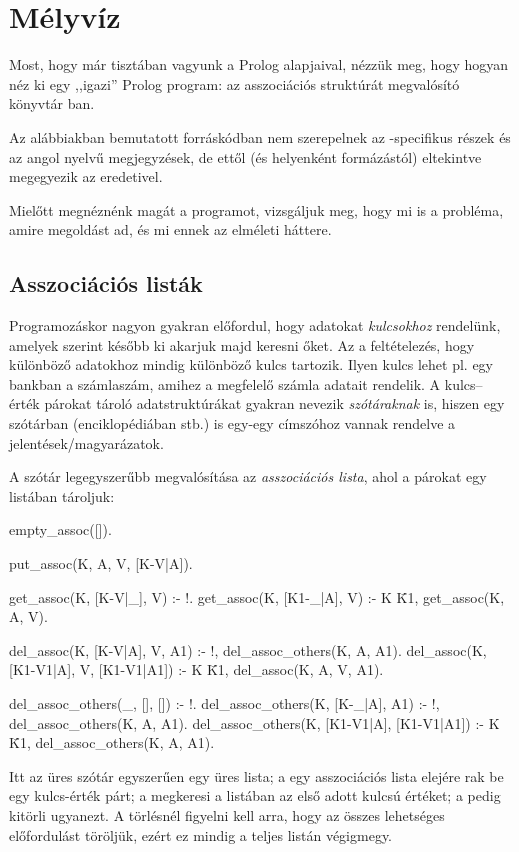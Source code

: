 \chapter{Mélyvíz}
Most, hogy már tisztában vagyunk a Prolog
alapjaival, nézzük meg, hogy hogyan néz ki egy
,,igazi'' Prolog program: az asszociációs struktúrát
megvalósító könyvtár ban.

Az alábbiakban bemutatott forráskódban nem
szerepelnek az -specifikus részek
és az angol nyelvű megjegyzések, de ettől (és
helyenként formázástól) eltekintve megegyezik az
eredetivel.

Mielőtt megnéznénk magát a programot, vizsgáljuk
meg, hogy mi is a probléma, amire megoldást ad, és
mi ennek az elméleti háttere.

\section{Asszociációs listák}
Programozáskor nagyon gyakran előfordul, hogy
adatokat \emph{kulcsokhoz} rendelünk, amelyek
szerint később ki akarjuk majd keresni őket. Az a
feltételezés, hogy különböző adatokhoz mindig
különböző kulcs tartozik. Ilyen kulcs lehet pl. egy
bankban a számlaszám, amihez a megfelelő számla
adatait rendelik. A kulcs--érték párokat tároló
adatstruktúrákat gyakran nevezik \emph{szótáraknak}
is, hiszen egy szótárban (enciklopédiában stb.) is
egy-egy címszóhoz vannak rendelve a
jelentések/magyarázatok.

A szótár legegyszerűbb megvalósítása az
\emph{asszociációs lista}, ahol a párokat egy
listában tároljuk: 
\begin{program}
empty_assoc([]).

put_assoc(K, A, V, [K-V|A]).

get_assoc(K, [K-V|_], V) :- !.
get_assoc(K, [K1-_|A], V) :-
    K \= K1, get_assoc(K, A, V).

del_assoc(K, [K-V|A], V, A1) :-
    !, del_assoc_others(K, A, A1).
del_assoc(K, [K1-V1|A], V, [K1-V1|A1]) :-
    K \= K1, del_assoc(K, A, V, A1).

del_assoc_others(_, [], []) :- !.
del_assoc_others(K, [K-_|A], A1) :-
    !, del_assoc_others(K, A, A1).
del_assoc_others(K, [K1-V1|A], [K1-V1|A1]) :-
    K \= K1, del_assoc_others(K, A, A1).
\end{program}
Itt az üres szótár egyszerűen egy üres lista; a
 egy asszociációs lista elejére rak
be egy kulcs-érték párt; a  megkeresi
a listában az első adott kulcsú értéket; a
 pedig kitörli ugyanezt. A törlésnél
figyelni kell arra, hogy az összes lehetséges
előfordulást töröljük, ezért ez mindig a teljes
listán végigmegy.

